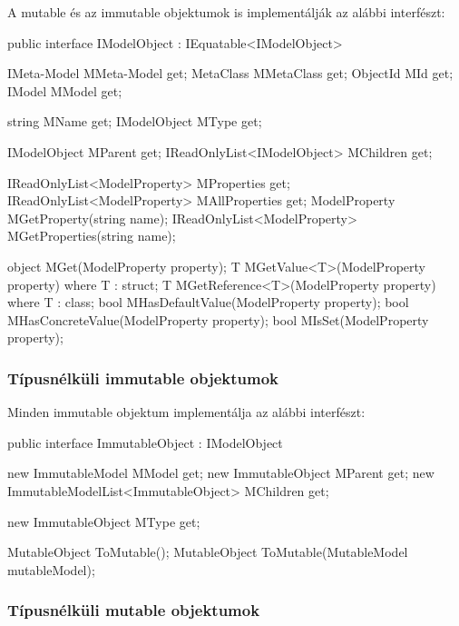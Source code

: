 \documentclass[12pt, a4paper]{report}
\begin{document}
A mutable és az immutable objektumok is implementálják az alábbi interfészt:
\begin{csharpcode}
public interface IModelObject : IEquatable<IModelObject>
{
	IMeta-Model MMeta-Model { get; }
	MetaClass MMetaClass { get; }
	ObjectId MId { get; }
	IModel MModel { get; }
	
	string MName { get; }
	IModelObject MType { get; }
	
	IModelObject MParent { get; }
	IReadOnlyList<IModelObject> MChildren { get; }
	
	IReadOnlyList<ModelProperty> MProperties { get; }
	IReadOnlyList<ModelProperty> MAllProperties { get; }
	ModelProperty MGetProperty(string name);
	IReadOnlyList<ModelProperty> MGetProperties(string name);
	
	object MGet(ModelProperty property);
	T MGetValue<T>(ModelProperty property) where T : struct;
	T MGetReference<T>(ModelProperty property) where T : class;
	bool MHasDefaultValue(ModelProperty property);
	bool MHasConcreteValue(ModelProperty property);
	bool MIsSet(ModelProperty property);
}
\end{csharpcode}

\subsubsection{Típusnélküli immutable objektumok}

Minden immutable objektum implementálja az alábbi interfészt:
\begin{csharpcode}
public interface ImmutableObject : IModelObject
{
	new ImmutableModel MModel { get; }
	new ImmutableObject MParent { get; }
	new ImmutableModelList<ImmutableObject> MChildren { get; }
	
	new ImmutableObject MType { get; }
	
	MutableObject ToMutable();
	MutableObject ToMutable(MutableModel mutableModel);
}
\end{csharpcode}

\subsubsection{Típusnélküli mutable objektumok}
\end{document}
